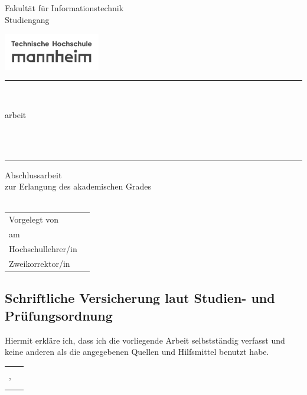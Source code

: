 \begin{titlepage}
  \parbox[b]{60mm}{
    Fakultät für Informationstechnik\\
    Studiengang \studiengang}
  \hfill
  \parbox[b]{42mm}{\includegraphics[width=42mm,valign=c,raise=3mm]{images/thmannheimlogo_grey.pdf}}
  \begin{center}
    \rule{1\textwidth}{1pt}\\[-3mm]
    \parbox[t][64mm]{110mm}{%
      \begin{center}
        \Large{\welchethesis arbeit}\\[2mm]
        {\begin{spacing}{1.13} \huge \bfseries \titel \end{spacing}}
        \vfill
        \Large{\autor} \\[1mm] %
        \ 
      \end{center}
    }
    \rule{\textwidth}{1pt}    
    \vfill    
    {\Large Abschlussarbeit} \\[5mm]
    {\large zur Erlangung des akademischen Grades} \\[5mm]
    {\large \welchethesis\ \thesisofwas} \\[5mm]
    \vfill    
    \begin{tabular}{ll} %
      Vorgelegt von & \autor \\
      am & \datum \\
      Hochschullehrer/in & \hochschullehrer \\
      Zweikorrektor/in & \zweikorrektor
    \end{tabular}    
    \vfill
  \end{center}
\end{titlepage}
\cleardoublepage


\thispagestyle{empty}
\subsection*{Schriftliche Versicherung laut Studien- und Prüfungsordnung}

Hiermit erkläre ich, dass ich die vorliegende Arbeit selbstständig verfasst
und keine anderen als die angegebenen Quellen und Hilfsmittel benutzt habe.

\vspace{6em}
\noindent\begin{tabular}{p{}p{}}
\ort, \datum  & \rule{0.56\textwidth}{0.5pt}\\
              & \makebox[1cm]{\ } \autor
\end{tabular}

\vfill

\cleardoublepage
